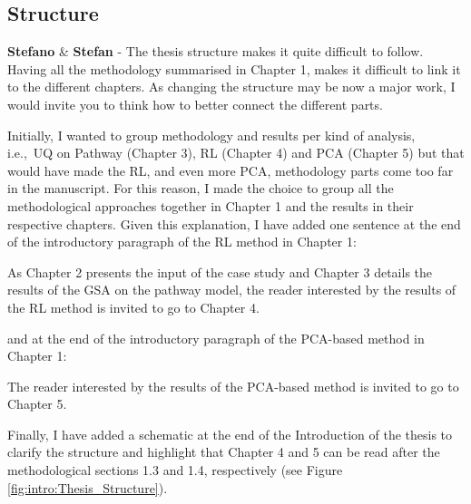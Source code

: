 \documentclass[12pt,a4paper]{article}
\def\ie{i.e.,\ }
\begin{document}
\begin{mdframed}[style=manuscript] %

\end{mdframed}

\subsection{Structure}
\label{structure}

\begin{mdframed}[style=comment] %
{\color{orange} \textbf{Stefano}} \& {\color{teal} \textbf{Stefan}} - The thesis structure makes it quite difficult to follow. Having all the methodology summarised in Chapter 1, makes it difficult to link it to the different chapters. As changing the structure may be now a major work, I would invite you to think how to better connect the different parts. 
\end{mdframed}

\noindent Initially, I wanted to group methodology and results per kind of analysis, \ie UQ on Pathway (Chapter 3), RL (Chapter 4) and PCA (Chapter 5) but that would have made the RL, and even more PCA, methodology parts come too far in the manuscript. For this reason, I made the choice to group all the methodological approaches together in Chapter 1 and the results in their respective chapters.  Given this explanation, I have added one sentence {\color{blue}at the end of the introductory paragraph of the RL method in Chapter 1}:

\begin{mdframed}[style=manuscript] %
As Chapter 2 presents the input of the case study and Chapter 3 details the results of the GSA on the pathway model, the reader interested by the results of the RL method is invited to go to Chapter 4.
\end{mdframed}

\noindent and {\color{blue}at the end of the introductory paragraph of the PCA-based method in Chapter 1}:

\begin{mdframed}[style=manuscript] %
The reader interested by the results of the PCA-based method is invited to go to Chapter 5.
\end{mdframed}

\noindent Finally, I have added a schematic at the end of the Introduction of the thesis to clarify the structure and highlight that Chapter 4 and 5 can be read after the methodological sections 1.3 and 1.4, respectively (see Figure \ref{fig:intro:Thesis_Structure}).
\end{document}
